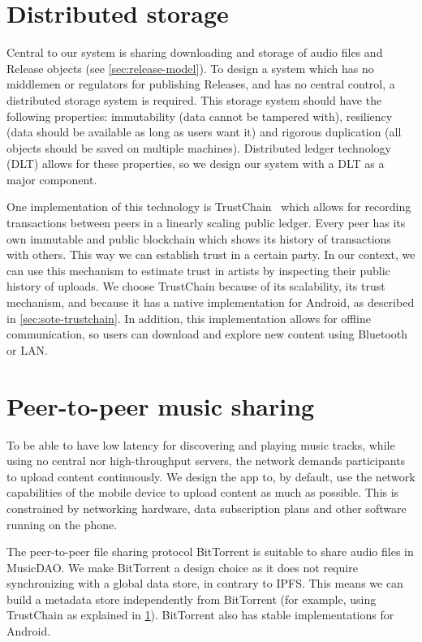 \section{Distributed storage}
\label{sec:distributed-storage}
Central to our system is sharing downloading and storage of audio files and Release objects (see \ref{sec:release-model}). To design a system which has no middlemen or regulators for publishing Releases, and has no central control, a distributed storage system is required. This storage system should have the following properties: immutability (data cannot be tampered with), resiliency (data should be available as long as users want it) and rigorous duplication (all objects should be saved on multiple machines). Distributed ledger technology (DLT) allows for these properties, so we design our system with a DLT as a major component.

One implementation of this technology is TrustChain~\citep{otte2017trustchain} which allows for recording transactions between peers in a linearly scaling public ledger. Every peer has its own immutable and public blockchain which shows its history of transactions with others. This way we can establish trust in a certain party. In our context, we can use this mechanism to estimate trust in artists by inspecting their public history of uploads. We choose TrustChain because of its scalability, its trust mechanism, and because it has a native implementation for Android, as described in \ref{sec:sote-trustchain}. In addition, this implementation allows for offline communication, so users can download and explore new content using Bluetooth or LAN.

\section{Peer-to-peer music sharing}
\label{sec:p2p-music-sharing}
To be able to have low latency for discovering and playing music tracks, while using no central nor high-throughput servers, the network demands participants to upload content continuously. We design the app to, by default, use the network capabilities of the mobile device to upload content as much as possible. This is constrained by networking hardware, data subscription plans and other software running on the phone.

The peer-to-peer file sharing protocol BitTorrent is suitable to share audio files in MusicDAO. We make BitTorrent a design choice as it does not require synchronizing with a global data store, in contrary to IPFS. This means we can build a metadata store independently from BitTorrent (for example, using TrustChain as explained in \ref{sec:distributed-storage}). BitTorrent also has stable implementations for Android.

